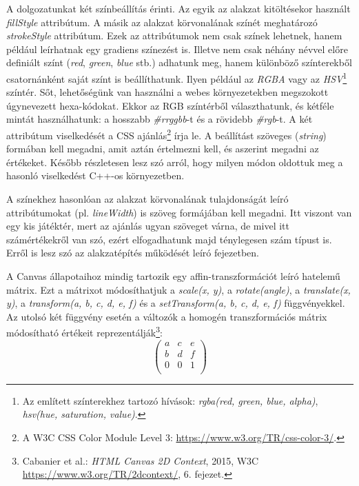 \documentclass[12pt]{report}
\theoremstyle{definition}
\newcommand{\func}[1]{{\textsl{#1}}}
\begin{document}
A dolgozatunkat két színbeállítás érinti. Az egyik az alakzat kitöltésekor
használt \func{fillStyle} attribútum. A másik az alakzat körvonalának színét
meghatározó \func{strokeStyle} attribútum. Ezek az attribútumok nem csak színek
lehetnek, hanem például leírhatnak egy gradiens színezést is. Illetve nem csak
néhány névvel előre definiált színt (\func{red}, \func{green}, \func{blue}
stb.) adhatunk meg, hanem különböző színterekből csatornánként saját színt is
beállíthatunk. Ilyen például az \emph{RGBA} vagy az \emph{HSV}\footnote{Az
említett színterekhez tartozó hívások: \func{rgba(red, green, blue, alpha)},
\func{hsv(hue, saturation, value)}.} színtér. Sőt, lehetőségünk van használni a
webes környezetekben megszokott úgynevezett hexa-kódokat. Ekkor az RGB
színtérből választhatunk, és kétféle mintát használhatunk: a hosszabb
\func{\#rrggbb}-t és a rövidebb \func{\#rgb}-t. A két attribútum viselkedését a
CSS ajánlás\footnote{A W3C CSS Color Module Level 3:\footnotesize{
\url{https://www.w3.org/TR/css-color-3/}}.} írja le. A beállítást szöveges
(\func{string}) formában kell megadni, amit aztán értelmezni kell, és aszerint
megadni az értékeket. Később részletesen lesz szó arról, hogy milyen módon
oldottuk meg a hasonló viselkedést C++-os környezetben.

A színekhez hasonlóan az alakzat körvonalának tulajdonságát leíró
attribútumokat (pl. \func{lineWidth}) is szöveg formájában kell megadni. Itt
viszont van egy kis játéktér, mert az ajánlás ugyan szöveget várna, de mivel
itt számértékekről van szó, ezért elfogadhatunk majd ténylegesen szám típust
is. Erről is lesz szó az alakzatépítés működését leíró fejezetben.

A Canvas állapotaihoz mindig tartozik egy affin-transzformációt leíró hatelemű
mátrix. Ezt a mátrixot módosíthatjuk a \func{scale(x, y)}, a
\func{rotate(angle)}, a \func{translate(x, y)},  a \func{transform(a, b, c, d,
e, f)} és a \func{setTransform(a, b, c, d, e, f)} függvényekkel. Az utolsó két
függvény esetén a változók a homogén transzformációs mátrix módosítható
értékeit reprezentálják\footnote{Cabanier et al.: \emph{{HTML} Canvas {2D}
Context}, 2015, W3C\\ \footnotesize{ \url{https://www.w3.org/TR/2dcontext/}},
6. fejezet.}: \[\begin{pmatrix}a & c & e \\ b & d & f \\ 0 & 0 & 1 \\
\end{pmatrix}\]
\end{document}
